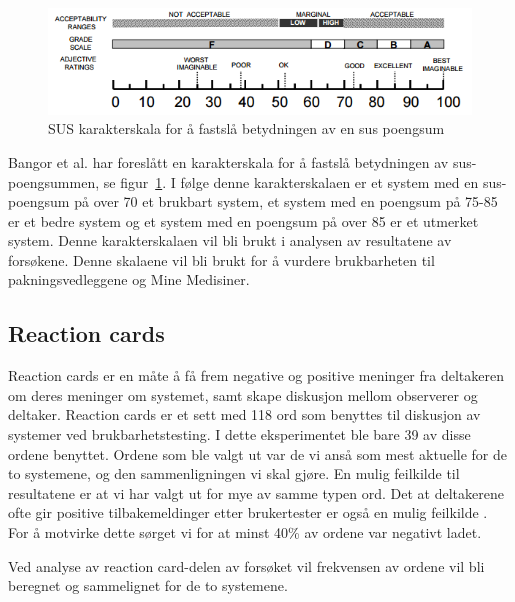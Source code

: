 \begin{figure}[H]
    \centering
    \includegraphics[width=1\textwidth]{fig/eksperimentdesign/sus-score.PNG}
    \caption{SUS karakterskala for å fastslå betydningen av en \acrshort{sus} poengsum \citep{bangor2009determining}}
    \label{fig:sus}
\end{figure}

Bangor et al.\citep{bangor2009determining} har foreslått en karakterskala for å fastslå betydningen av \acrshort{sus}-poengsummen, se figur~\ref{fig:sus}. I følge denne karakterskalaen er et system med en \acrshort{sus}-poengsum på over 70 et brukbart system, et system med en poengsum på 75-85 er et bedre system og et system med en poengsum på over 85 er et utmerket system. Denne karakterskalaen vil bli brukt i analysen av resultatene av forsøkene. Denne skalaene vil bli brukt for å vurdere brukbarheten til pakningsvedleggene og Mine Medisiner. 

\subsection{Reaction cards} \label{sec:reactionCards}
Reaction cards er en måte å få frem negative og positive meninger fra deltakeren om deres meninger om systemet, samt skape diskusjon mellom observerer og deltaker. Reaction cards er et sett med 118 ord som benyttes til diskusjon av systemer ved brukbarhetstesting. I dette eksperimentet ble bare 39 av disse ordene benyttet. Ordene som ble valgt ut var de vi anså som mest aktuelle for de to systemene, og den sammenligningen vi skal gjøre. En mulig feilkilde til resultatene er at vi har valgt ut for mye av samme typen ord. Det at deltakerene ofte gir positive tilbakemeldinger etter brukertester er også en mulig feilkilde \citep{MeasuringSatisfaction, MeasuringDesirability}. For å motvirke dette sørget vi for at minst 40\% av ordene var negativt ladet.

Ved analyse av reaction card-delen av forsøket vil frekvensen av ordene vil bli beregnet og sammelignet for de to systemene.    



\clearpage
